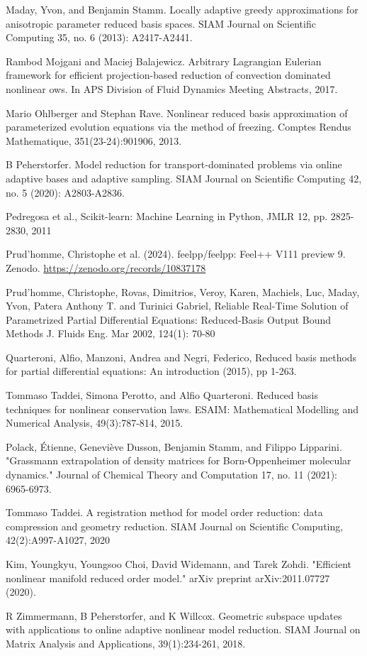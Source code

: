 \begin{thebibliography}{99}
Maday, Yvon, and Benjamin Stamm. Locally adaptive greedy approximations for anisotropic parameter reduced basis spaces. SIAM Journal on Scientific Computing 35, no. 6 (2013): A2417-A2441.


Rambod Mojgani and Maciej Balajewicz. Arbitrary Lagrangian Eulerian framework for efficient projection-based reduction of convection dominated nonlinear ows. In APS Division of Fluid Dynamics Meeting Abstracts, 2017.

Mario Ohlberger and Stephan Rave. Nonlinear reduced basis approximation of parameterized evolution equations via the method of freezing. Comptes Rendus Mathematique, 351(23-24):901{906, 2013}.

B Peherstorfer. Model reduction for transport-dominated problems via online adaptive bases and adaptive sampling. SIAM Journal on Scientific Computing 42, no. 5 (2020): A2803-A2836.


Pedregosa et al., Scikit-learn: Machine Learning in Python, JMLR 12, pp. 2825-2830, 2011

Prud'homme, Christophe et al. (2024). feelpp/feelpp: Feel++ V111 preview 9. Zenodo. \url{https://zenodo.org/records/10837178}

Prud'homme, Christophe, Rovas, Dimitrios, Veroy, Karen, Machiels, Luc, Maday, Yvon, Patera Anthony T. and Turinici Gabriel, Reliable Real-Time Solution of Parametrized Partial Differential Equations: Reduced-Basis Output Bound Methods 
 J. Fluids Eng. Mar 2002, 124(1): 70-80

  
Quarteroni, Alfio, Manzoni, Andrea and Negri, Federico, Reduced basis methods for partial differential equations: An introduction (2015), pp 1-263.

Tommaso Taddei, Simona Perotto, and Alfio Quarteroni. Reduced basis techniques for nonlinear conservation laws. ESAIM: Mathematical Modelling and Numerical Analysis, 49(3):787-814, 2015.


Polack, Étienne, Geneviève Dusson, Benjamin Stamm, and Filippo Lipparini. "Grassmann extrapolation of density matrices for Born-Oppenheimer molecular dynamics." Journal of Chemical Theory and Computation 17, no. 11 (2021): 6965-6973.


 Tommaso Taddei. A registration method for model order reduction: data compression and geometry reduction. SIAM Journal on Scientific Computing, 42(2):A997-A1027, 2020

Kim, Youngkyu, Youngsoo Choi, David Widemann, and Tarek Zohdi. "Efficient nonlinear manifold reduced order model." arXiv preprint arXiv:2011.07727 (2020).

R Zimmermann, B Peherstorfer, and K Willcox. Geometric subspace updates with applications to online adaptive nonlinear model reduction. SIAM Journal on Matrix Analysis and Applications, 39(1):234-261, 2018.



\end{thebibliography}